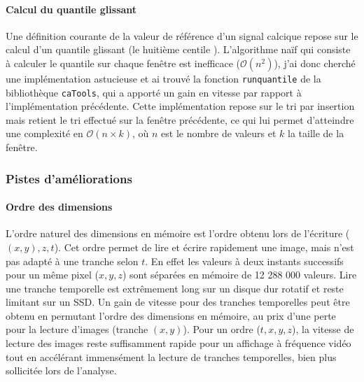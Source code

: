 \paragraph{Calcul du quantile glissant}
Une définition courante de la valeur de référence d'un signal calcique repose sur le calcul d'un quantile glissant (le huitième centile  \cite{dombeck_imaging_2007}). L'algorithme naïf qui consiste à calculer le quantile sur chaque fenêtre est inefficace ($\mathcal{O}(n^2)$), j'ai donc cherché une implémentation astucieuse et ai trouvé la fonction \verb|runquantile| de la bibliothèque \verb|caTools|, qui a apporté un gain en vitesse par rapport à l'implémentation précédente. Cette implémentation repose sur le tri par insertion mais retient le tri effectué sur la fenêtre précédente, ce qui lui permet d'atteindre une complexité en $\mathcal{O}(n\times k)$, où $n$ est le nombre de valeurs et $k$ la taille de la fenêtre.



\subsubsection{Pistes d'améliorations}

\paragraph{Ordre des dimensions}
L'ordre naturel des dimensions en mémoire est l'ordre obtenu lors de l'écriture ($(x,y),z,t$). Cet ordre permet de lire et écrire rapidement une image, mais n'est pas adapté à une tranche selon $t$. En effet les valeurs à deux instants successifs pour un même pixel ($x,y,z$) sont séparées en mémoire de 12 288 000 valeurs. Lire une tranche temporelle est extrêmement long sur un disque dur rotatif et reste limitant sur un SSD. Un gain de vitesse pour des tranches temporelles peut être obtenu en permutant l'ordre des dimensions en mémoire, au prix d'une perte pour la lecture d'images (tranche $(x,y)$). Pour un ordre ($t,x,y,z$), la vitesse de lecture des images reste suffisamment rapide pour un affichage à fréquence vidéo tout en accélérant immensément la lecture de tranches temporelles, bien plus sollicitée lors de l'analyse.

